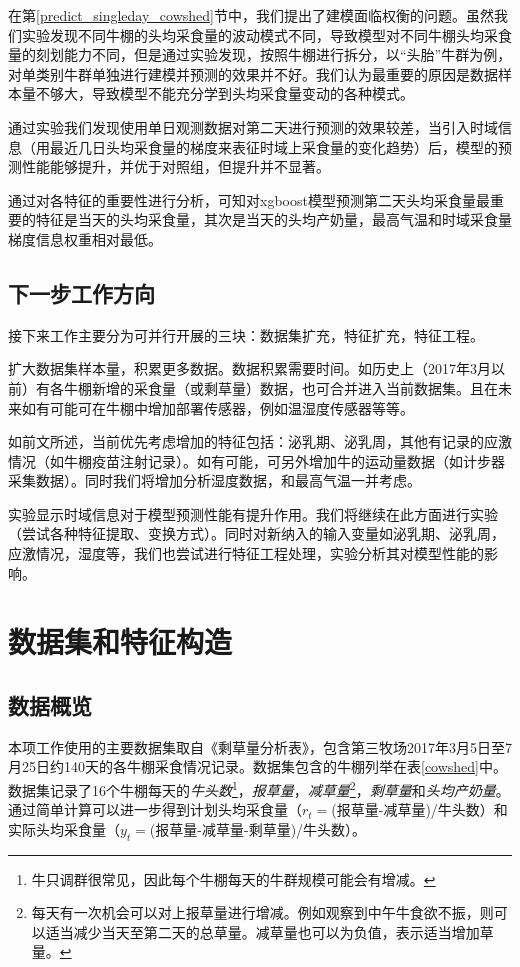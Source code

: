 在第\ref{predict_singleday_cowshed}节中，我们提出了建模面临权衡的问题。虽然我们实验发现不同牛棚的头均采食量的波动模式不同，导致模型对不同牛棚头均采食量的刻划能力不同，但是通过实验发现，按照牛棚进行拆分，以“头胎”牛群为例，对单类别牛群单独进行建模并预测的效果并不好。我们认为最重要的原因是数据样本量不够大，导致模型不能充分学到头均采食量变动的各种模式。

通过实验我们发现使用单日观测数据对第二天进行预测的效果较差，当引入时域信息（用最近几日头均采食量的梯度来表征时域上采食量的变化趋势）后，模型的预测性能能够提升，并优于对照组，但提升并不显著。

通过对各特征的重要性进行分析，可知对xgboost模型预测第二天头均采食量最重要的特征是当天的头均采食量，其次是当天的头均产奶量，最高气温和时域采食量梯度信息权重相对最低。


\subsection{下一步工作方向}

接下来工作主要分为可并行开展的三块：数据集扩充，特征扩充，特征工程。

扩大数据集样本量，积累更多数据。数据积累需要时间。如历史上（2017年3月以前）有各牛棚新增的采食量（或剩草量）数据，也可合并进入当前数据集。且在未来如有可能可在牛棚中增加部署传感器，例如温湿度传感器等等。

如前文所述，当前优先考虑增加的特征包括：泌乳期、泌乳周，其他有记录的应激情况（如牛棚疫苗注射记录）。如有可能，可另外增加牛的运动量数据（如计步器采集数据）。同时我们将增加分析湿度数据，和最高气温一并考虑。

实验显示时域信息对于模型预测性能有提升作用。我们将继续在此方面进行实验（尝试各种特征提取、变换方式）。同时对新纳入的输入变量如泌乳期、泌乳周，应激情况，湿度等，我们也尝试进行特征工程处理，实验分析其对模型性能的影响。\section{数据集和特征构造}
\label{dataset}

\subsection{数据概览}

本项工作使用的主要数据集取自《剩草量分析表》，包含第三牧场2017年3月5日至7月25日约140天的各牛棚采食情况记录。数据集包含的牛棚列举在表\ref{cowshed}中。数据集记录了16个牛棚每天的\emph{牛头数}\footnote{牛只调群很常见，因此每个牛棚每天的牛群规模可能会有增减。}，\emph{报草量}，\emph{减草量}\footnote{每天有一次机会可以对上报草量进行增减。例如观察到中午牛食欲不振，则可以适当减少当天至第二天的总草量。减草量也可以为负值，表示适当增加草量。}，\emph{剩草量}和\emph{头均产奶量}。通过简单计算可以进一步得到计划头均采食量（$r_t =$(报草量-减草量)/牛头数）和实际头均采食量（$y_t =$(报草量-减草量-剩草量)/牛头数）。

